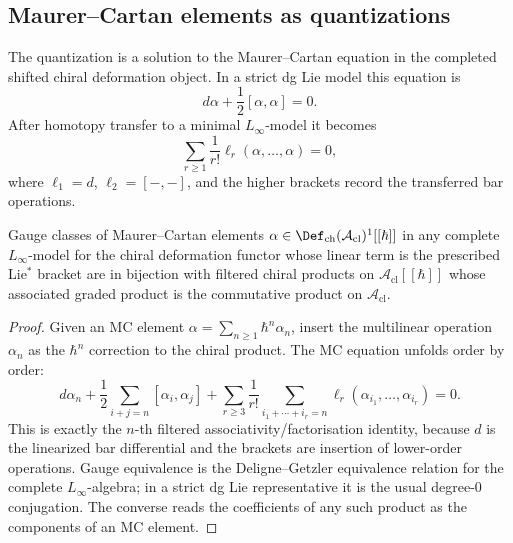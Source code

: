 \subsection{Maurer--Cartan elements as quantizations}

The quantization is a solution to the Maurer--Cartan equation in the
completed shifted chiral deformation object. In a strict dg Lie model
this equation is
\[
d\alpha+\frac12[\alpha,\alpha]=0.
\]
After homotopy transfer to a minimal \(L_\infty\)-model it becomes
\[
\sum_{r\geq1}\frac1{r!}\ell_r(\alpha,\ldots,\alpha)=0,
\]
where \(\ell_1=d\), \(\ell_2=[-,-]\), and the higher brackets record
the transferred bar operations.

\begin{proposition}
\label{prop:mc-star-product}
Gauge classes of Maurer--Cartan elements
\(\alpha\in\Def_{\mathrm{ch}}(\mathcal{A}_{\mathrm{cl}})^1[[\hbar]]\)
in any complete \(L_\infty\)-model for the chiral deformation functor
whose linear term is the prescribed Lie$^*$ bracket are in bijection
with filtered chiral products on $\mathcal{A}_{\mathrm{cl}}[[\hbar]]$
whose associated graded product is the commutative product on
$\mathcal{A}_{\mathrm{cl}}$.
\end{proposition}

\begin{proof}
Given an MC element
$\alpha=\sum_{n\geq1}\hbar^n\alpha_n$, insert the multilinear
operation $\alpha_n$ as the $\hbar^n$ correction to the chiral product.
The MC equation unfolds order by order:
\[
d\alpha_n+\frac12\sum_{i+j=n}[\alpha_i,\alpha_j]
+\sum_{r\geq3}\frac1{r!}
\sum_{i_1+\cdots+i_r=n}
\ell_r(\alpha_{i_1},\ldots,\alpha_{i_r})=0.
\]
This is exactly the $n$-th filtered associativity/factorisation
identity, because $d$ is the linearized bar differential and the
brackets are insertion of lower-order operations. Gauge equivalence is
the Deligne--Getzler equivalence relation for the complete
\(L_\infty\)-algebra; in a strict dg Lie representative it is the usual
degree-$0$ conjugation. The converse reads the coefficients of any such
product as the components of an MC element.
\end{proof}

